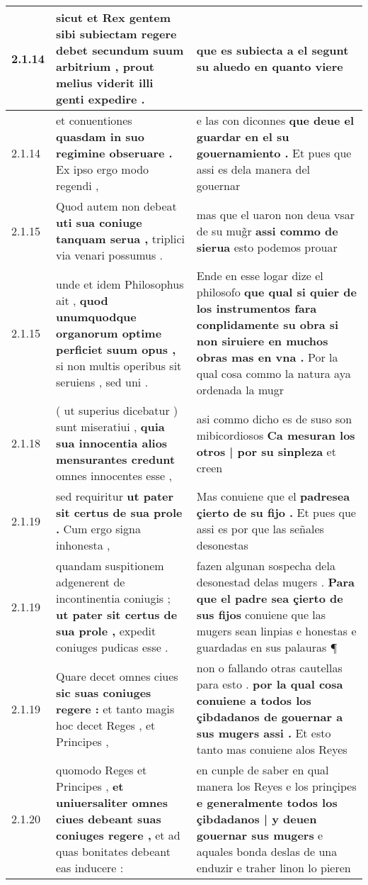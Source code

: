\begin{tabular}{|p{1cm}|p{6.5cm}|p{6.5cm}|}
2.1.14 & sicut et Rex gentem sibi subiectam regere debet \textbf{ secundum suum arbitrium , } prout melius viderit illi genti expedire . & que es subiecta a el \textbf{ segunt su aluedo } en quanto viere \\\hline
2.1.14 & et conuentiones \textbf{ quasdam in suo regimine obseruare . } Ex ipso ergo modo regendi , & e las con diconnes \textbf{ que deue el guardar en el su gouernamiento . } Et pues que assi es dela manera del gouernar \\\hline
2.1.15 & Quod autem non debeat \textbf{ uti sua coniuge tanquam serua , } triplici via venari possumus . & mas que el uaron non deua vsar de su mug̃r \textbf{ assi commo de sierua } esto podemos prouar \\\hline
2.1.15 & unde et idem Philosophus ait , \textbf{ quod unumquodque organorum optime perficiet suum opus , } si non multis operibus sit seruiens , sed uni . & Ende en esse logar dize el philosofo \textbf{ que qual si quier de los instrumentos fara conplidamente su obra si non siruiere en muchos obras mas en vna . } Por la qual cosa commo la natura aya ordenada la mugr \\\hline
2.1.18 & ( ut superius dicebatur ) sunt miseratiui , \textbf{ quia sua innocentia alios mensurantes credunt } omnes innocentes esse , & asi commo dicho es de suso son mibicordiosos \textbf{ Ca mesuran los otros | por su sinpleza } et creen \\\hline
2.1.19 & sed requiritur \textbf{ ut pater sit certus de sua prole . } Cum ergo signa inhonesta , & Mas conuiene que el \textbf{ padresea çierto de su fijo . } Et pues que assi es por que las señales desonestas \\\hline
2.1.19 & quandam suspitionem adgenerent de incontinentia coniugis ; \textbf{ ut pater sit certus de sua prole , } expedit coniuges pudicas esse . & fazen algunan sospecha dela desonestad delas mugers . \textbf{ Para que el padre sea çierto de sus fijos } conuiene que las mugers sean linpias e honestas e guardadas en sus palauras ¶ \\\hline
2.1.19 & Quare decet omnes ciues \textbf{ sic suas coniuges regere : } et tanto magis hoc decet Reges , et Principes , & non o fallando otras cautellas para esto . \textbf{ por la qual cosa conuiene a todos los çibdadanos de gouernar a sus mugers assi . } Et esto tanto mas conuiene alos Reyes \\\hline
2.1.20 & quomodo Reges et Principes , \textbf{ et uniuersaliter omnes ciues debeant suas coniuges regere , } et ad quas bonitates debeant eas inducere : & en cunple de saber en qual manera los Reyes e los prinçipes \textbf{ e generalmente todos los çibdadanos | y deuen gouernar sus mugers } e aquales bonda deslas de una enduzir e traher linon lo pieren \\\hline

\end{tabular}
